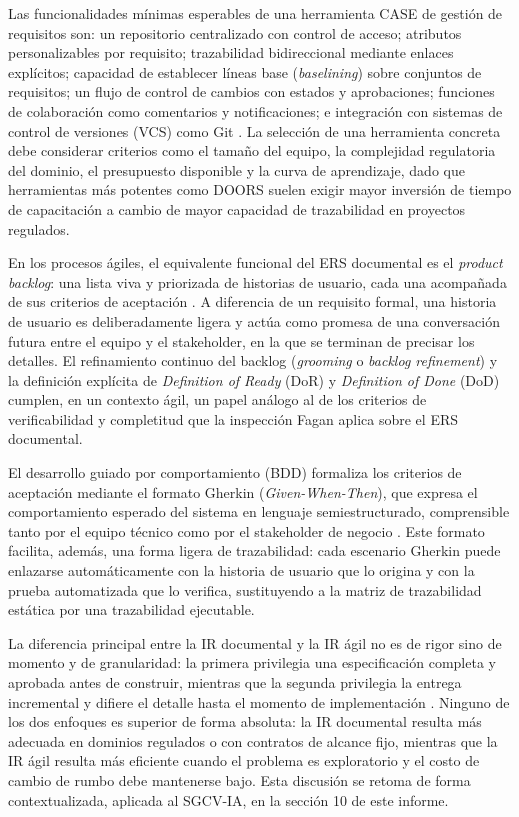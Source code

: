 \documentclass[11pt,a4paper]{article}
\newcommand{\subseccion}[1]{%
  \vspace{0.35cm}
  \noindent{\color{uteqverde}\textbf{\large #1}}\par
  \vspace{0.15cm}
}
\begin{document}
Las funcionalidades mínimas esperables de una herramienta CASE de gestión de
requisitos son: un repositorio centralizado con control de acceso; atributos
personalizables por requisito; trazabilidad bidireccional mediante enlaces
explícitos; capacidad de establecer líneas base (\textit{baselining}) sobre
conjuntos de requisitos; un flujo de control de cambios con estados y
aprobaciones; funciones de colaboración como comentarios y notificaciones; e
integración con sistemas de control de versiones (VCS) como Git
\cite{clelandhuang2012}. La selección de una herramienta concreta debe considerar
criterios como el tamaño del equipo, la complejidad regulatoria del dominio, el
presupuesto disponible y la curva de aprendizaje, dado que herramientas más
potentes como DOORS suelen exigir mayor inversión de tiempo de capacitación a
cambio de mayor capacidad de trazabilidad en proyectos regulados.

\subseccion{3.5 IR en procesos ágiles}

En los procesos ágiles, el equivalente funcional del ERS documental es el
\textit{product backlog}: una lista viva y priorizada de historias de usuario,
cada una acompañada de sus criterios de aceptación \cite{cohn2004}. A diferencia
de un requisito formal, una historia de usuario es deliberadamente ligera y actúa
como promesa de una conversación futura entre el equipo y el stakeholder, en la
que se terminan de precisar los detalles. El refinamiento continuo del backlog
(\textit{grooming} o \textit{backlog refinement}) y la definición explícita de
\textit{Definition of Ready} (DoR) y \textit{Definition of Done} (DoD) cumplen,
en un contexto ágil, un papel análogo al de los criterios de verificabilidad y
completitud que la inspección Fagan aplica sobre el ERS documental.

El desarrollo guiado por comportamiento (BDD) formaliza los criterios de
aceptación mediante el formato Gherkin (\textit{Given-When-Then}), que expresa el
comportamiento esperado del sistema en lenguaje semiestructurado, comprensible
tanto por el equipo técnico como por el stakeholder de negocio \cite{smart2014}.
Este formato facilita, además, una forma ligera de trazabilidad: cada escenario
Gherkin puede enlazarse automáticamente con la historia de usuario que lo origina
y con la prueba automatizada que lo verifica, sustituyendo a la matriz de
trazabilidad estática por una trazabilidad ejecutable.

La diferencia principal entre la IR documental y la IR ágil no es de rigor sino
de momento y de granularidad: la primera privilegia una especificación completa y
aprobada antes de construir, mientras que la segunda privilegia la entrega
incremental y difiere el detalle hasta el momento de implementación
\cite{cohn2004}. Ninguno de los dos enfoques es superior de forma absoluta: la IR
documental resulta más adecuada en dominios regulados o con contratos de alcance
fijo, mientras que la IR ágil resulta más eficiente cuando el problema es
exploratorio y el costo de cambio de rumbo debe mantenerse bajo. Esta discusión se
retoma de forma contextualizada, aplicada al SGCV-IA, en la sección 10 de este
informe.
\end{document}
